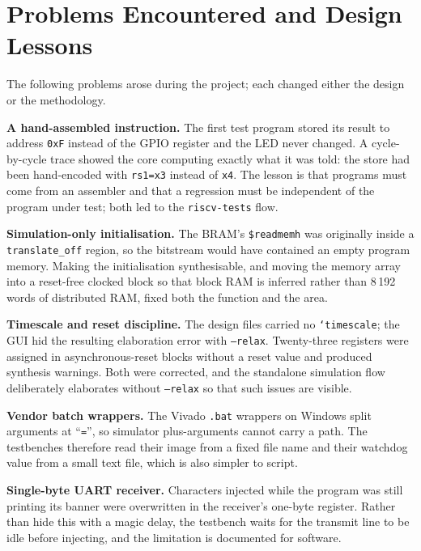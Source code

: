 \documentclass[journal,10pt]{IEEEtran}
\newcommand{\reg}[1]{\texttt{#1}}
\begin{document}
\section{Problems Encountered and Design Lessons}\label{sec:lessons}
The following problems arose during the project; each changed either the
design or the methodology.

\textbf{A hand-assembled instruction.} The first test program stored its
result to address \reg{0xF} instead of the GPIO register and the LED never
changed. A cycle-by-cycle trace showed the core computing exactly what it was
told: the store had been hand-encoded with \reg{rs1=x3} instead of
\reg{x4}. The lesson is that programs must come from an assembler and that
a regression must be independent of the program under test; both led to the
\reg{riscv-tests} flow.

\textbf{Simulation-only initialisation.} The BRAM's \reg{\$readmemh} was
originally inside a \reg{translate\_off} region, so the bitstream would have
contained an empty program memory. Making the initialisation synthesisable,
and moving the memory array into a reset-free clocked block so that block RAM
is inferred rather than 8\,192 words of distributed RAM, fixed both the
function and the area.

\textbf{Timescale and reset discipline.} The design files carried no
\reg{`timescale}; the GUI hid the resulting elaboration error with
\reg{--relax}. Twenty-three registers were assigned in asynchronous-reset
blocks without a reset value and produced synthesis warnings. Both were
corrected, and the standalone simulation flow deliberately elaborates without
\reg{--relax} so that such issues are visible.

\textbf{Vendor batch wrappers.} The Vivado \reg{.bat} wrappers on Windows
split arguments at ``\reg{=}'', so simulator plus-arguments cannot carry a
path. The testbenches therefore read their image from a fixed file name and
their watchdog value from a small text file, which is also simpler to script.

\textbf{Single-byte UART receiver.} Characters injected while the program
was still printing its banner were overwritten in the receiver's one-byte
register. Rather than hide this with a magic delay, the testbench waits for
the transmit line to be idle before injecting, and the limitation is
documented for software.
\end{document}
